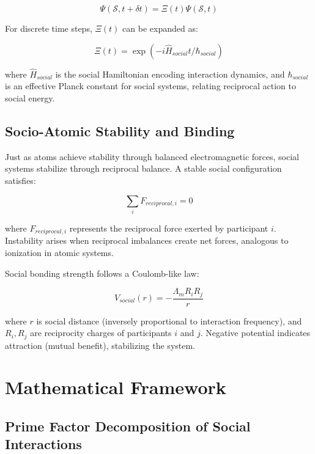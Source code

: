 \documentclass[11pt,a4paper]{article}
\begin{document}
\begin{equation}
\Psi(\mathcal{S}, t + \delta t) = \Xi(t) \Psi(\mathcal{S}, t)
\end{equation}

For discrete time steps, $\Xi(t)$ can be expanded as:

\begin{equation}
\Xi(t) = \exp\left(-i\hat{H}_{social}t/\hbar_{social}\right)
\end{equation}

where $\hat{H}_{social}$ is the social Hamiltonian encoding interaction dynamics, and $\hbar_{social}$ is an effective Planck constant for social systems, relating reciprocal action to social energy.

\subsection{Socio-Atomic Stability and Binding}

Just as atoms achieve stability through balanced electromagnetic forces, social systems stabilize through reciprocal balance. A stable social configuration satisfies:

\begin{equation}
\sum_i F_{reciprocal,i} = 0
\end{equation}

where $F_{reciprocal,i}$ represents the reciprocal force exerted by participant $i$. Instability arises when reciprocal imbalances create net forces, analogous to ionization in atomic systems.

Social bonding strength follows a Coulomb-like law:

\begin{equation}
V_{social}(r) = -\frac{\Lambda_m R_i R_j}{r}
\end{equation}

where $r$ is social distance (inversely proportional to interaction frequency), and $R_i, R_j$ are reciprocity charges of participants $i$ and $j$. Negative potential indicates attraction (mutual benefit), stabilizing the system.

\section{Mathematical Framework}
\label{sec:mathematics}

\subsection{Prime Factor Decomposition of Social Interactions}
\end{document}
